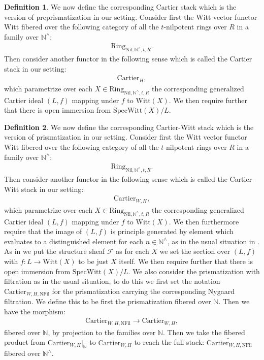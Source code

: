 \documentclass[12pt]{article}
\theoremstyle{definition}
\newtheorem{definition}{Definition}
\begin{document}
\begin{definition}
We now define the corresponding Cartier stack which is the version of preprismatization in our setting. Consider first the Witt vector functor $\mathrm{Witt}$ fibered over the following category of all the $t$-nilpotent rings over $R$ in a family over $\mathbb{N}^\wedge$:
\begin{align}
\mathrm{Ring}_{\mathrm{Nil},\mathbb{N}^\wedge,t,R}.
\end{align}
Then consider another functor in the following sense which is called the Cartier stack in our setting:
\begin{align}
\mathrm{Cartier}_H,
\end{align}
which parametrize over each $X\in \mathrm{Ring}_{\mathrm{Nil},\mathbb{N}^\wedge,t,R}$ the corresponding generalized Cartier ideal $(L,f)$ mapping under $f$ to $\mathrm{Witt}(X)$. We then require further that there is open immersion from $\mathrm{Spec}\mathrm{Witt}(X)/L$. 
\end{definition}


\begin{definition}
We now define the corresponding Cartier-Witt stack which is the version of prismatization in our setting. Consider first the Witt vector functor $\mathrm{Witt}$ fibered over the following category of all the $t$-nilpotent rings over $R$ in a family over $\mathbb{N}^\wedge$:
\begin{align}
\mathrm{Ring}_{\mathrm{Nil},\mathbb{N}^\wedge,t,R}.
\end{align}
Then consider another functor in the following sense which is called the Cartier-Witt  stack in our setting:
\begin{align}
\mathrm{Cartier}_{W,H},
\end{align}
which parametrize over each $X\in \mathrm{Ring}_{\mathrm{Nil},\mathbb{N}^\wedge,t,R}$ the corresponding generalized Cartier ideal $(L,f)$ mapping under $f$ to $\mathrm{Witt}(X)$. We then furthermore require that the image of $(L,f)$ is principle generated by element which evaluates to a distinguished element for each $n\in \mathbb{N}^\wedge$, as in the usual situation in \cite{2BL}. As in \cite{2BL} we put the structure sheaf $\mathcal{F}$ as for each $X$ we set the section over $(L,f)$ with $f:L\rightarrow \mathrm{Witt}(X)$ to be just $X$ itself. We then require further that there is open immersion from $\mathrm{Spec}\mathrm{Witt}(X)/L$. We also consider the prismatization with filtration as in the usual situation, to do this we first set the notation $\mathrm{Cartier}_{W,H,\mathrm{NFil}}$ for the prismatization carrying the corresponding Nygaard filtration. We define this to be first the prismatization fibered over $\mathbb{N}$. Then we have the morphism:
\begin{align}
\mathrm{Cartier}_{W,H,\mathrm{NFil}} \rightarrow \mathrm{Cartier}_{W,H},
\end{align}
fibered over $\mathbb{N}$, by projection to the families over $\mathbb{N}$. Then we take the fibered product from $\mathrm{Cartier}_{W,H}|_{\mathbb{N}}$ to $\mathrm{Cartier}_{W,H}$ to reach the full stack: $\widetilde{\mathrm{Cartier}_{W,H,\mathrm{NFil}}}$ fibered over $\mathbb{N}^\wedge$.
\end{definition}
\end{document}
